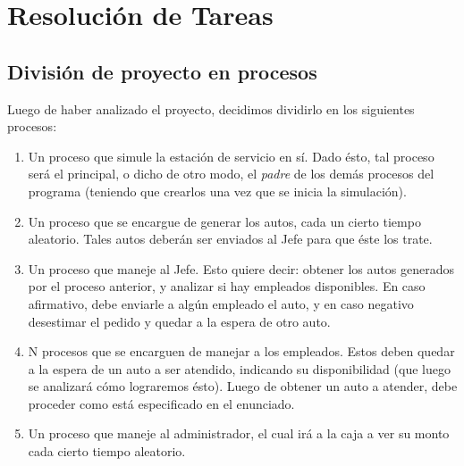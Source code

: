 \documentclass[a4paper,12pt]{article}
\begin{document}
\section{Resolución de Tareas}
\subsection{División de proyecto en procesos}
Luego de haber analizado el proyecto, decidimos dividirlo en los siguientes procesos:
\begin{enumerate}
	\item Un proceso que simule la estación de servicio en sí. Dado ésto, tal proceso será el
	principal, o dicho de otro modo, el \textit{padre} de los demás procesos del programa
	(teniendo que crearlos una vez que se inicia la simulación).
	\item Un proceso que se encargue de generar los autos, cada un cierto tiempo aleatorio.
	Tales autos deberán ser enviados al Jefe para que éste los trate.
	\item Un proceso que maneje al Jefe. Esto quiere decir: obtener los autos
	generados por el proceso anterior, y analizar si hay empleados disponibles. En caso
	afirmativo, debe enviarle a algún empleado el auto, y en caso negativo desestimar el
	pedido y quedar a la espera de otro auto.
	\item N procesos que se encarguen de manejar a los empleados. Estos deben quedar a la
	espera de un auto a ser atendido, indicando su disponibilidad (que luego se analizará cómo
	lograremos ésto). Luego de obtener un auto a atender, debe proceder como está especificado
	en el enunciado.
	\item Un proceso que maneje al administrador, el cual irá a la caja a ver su monto cada
	cierto tiempo aleatorio.
\end{enumerate}
\end{document}
